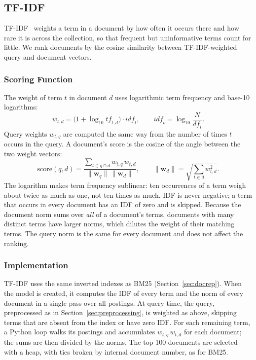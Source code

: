 \documentclass[sigconf,nonacm]{acmart}
\begin{document}
\subsection{TF-IDF}
\label{sec:tfidf}
TF-IDF~\cite[Ch.~6]{manning2008irbook} weights a term in a document by
how often it occurs there and how rare it is across the collection, so
that frequent but uninformative terms count for little. We rank
documents by the cosine similarity between TF-IDF-weighted query and
document vectors.


\subsubsection{Scoring Function}
The weight of term $t$ in document $d$ uses logarithmic term frequency
and base-10 logarithms:
\begin{equation}
  w_{t,d} = \bigl(1 + \log_{10} \mathit{tf}_{t,d}\bigr) \cdot \mathit{idf}_t,
  \qquad
  \mathit{idf}_t = \log_{10} \frac{N}{\mathit{df}_t}.
  \label{eq:tfidf-weight}
\end{equation}
Query weights $w_{t,q}$ are computed the same way from the number of
times $t$ occurs in the query. A document's score is the cosine of the
angle between the two weight vectors:
\begin{equation}
  \mathrm{score}(q,d) =
    \frac{\sum_{t \in q \cap d} w_{t,q}\, w_{t,d}}
         {\lVert \mathbf{w}_q \rVert \, \lVert \mathbf{w}_d \rVert},
  \qquad
  \lVert \mathbf{w}_d \rVert = \sqrt{\textstyle\sum_{t \in d} w_{t,d}^2}.
  \label{eq:cosine}
\end{equation}
The logarithm makes term frequency sublinear: ten occurrences of a term
weigh about twice as much as one, not ten times as much. IDF is never
negative; a term that occurs in every document has an IDF of zero and is
skipped. Because the document norm sums over \emph{all} of a document's
terms, documents with many distinct terms have larger norms, which
dilutes the weight of their matching terms. The query norm is the same
for every document and does not affect the ranking.


\subsubsection{Implementation}
TF-IDF uses the same inverted indexes as BM25
(Section~\ref{sec:docrep}). When the model is created, it computes the
IDF of every term and the norm of every document in a single pass over
all postings. At query time, the query, preprocessed as in
Section~\ref{sec:preprocessing}, is weighted as above, skipping terms
that are absent from the index or have zero IDF. For each remaining
term, a Python loop walks its postings and accumulates
$w_{t,q}\, w_{t,d}$ for each document; the sums are then divided by the
norms. The top 100 documents are selected with a heap, with ties broken
by internal document number, as for BM25.
\end{document}

